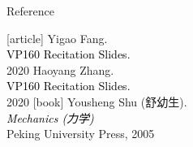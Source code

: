 \documentclass{beamer}
\begin{document}
\begin{frame}{Reference}
  \begin{thebibliography}{9}
  [article]
   Yigao Fang.\\
  \textcolor{black}{VP160 Recitation Slides.}\\
  2020
   Haoyang Zhang.\\
  \textcolor{black}{VP160 Recitation Slides.}\\
  2020
  [book]
   Yousheng Shu (舒幼生).\\
  \textcolor{black}{\textit{Mechanics (力学)}}\\
  Peking University Press, 2005
  \end{thebibliography}
  \end{frame}

  
\end{document}
